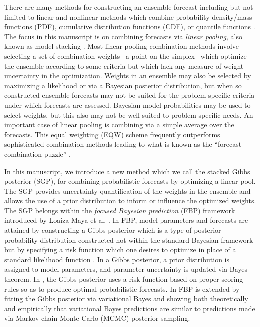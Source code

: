 There are many methods for constructing an ensemble forecast including but not 
limited to linear and nonlinear methods \cite[]{yao2018using,
geweke2011optimal,hall2007combining,bassetti2018bayesian,
gneiting2013combining,ranjan2010combining} which combine
probability density/mass functions (PDF), cumulative distribution functions 
(CDF), or quantile functions \cite[]{lichtendahl2013better}. The focus in this 
manuscript is on combining forecasts via \textit{linear pooling}, also known as 
model stacking \cite[]{yao2018using,geweke2011optimal,hall2007combining,
stone1961opinion}. Most linear pooling combination methods involve selecting 
a set of combination weights --a point on the simplex-- which optimize the 
ensemble according to some criteria but which lack any measure of weight
uncertainty in the optimization. Weights in an ensemble may also be selected 
by maximizing a likelihood or via a Bayesian posterior distribution, but when 
so constructed ensemble forecasts may not be suited for the problem specific 
criteria under which forecasts are assessed. Bayesian model probabilities may 
be used to select weights, but this also may not be well 
suited to problem specific needs. An important case of linear pooling is 
combining via a simple average over the forecasts. This equal weighting (EQW) 
scheme frequently outperforms sophisticated combination methods leading to 
what is known as the 
``forecast combination puzzle'' \cite[]{frazier2023solving,
claeskens2016forecast,smith2009simple}. 


In this manuscript, we introduce a new method which we call the stacked 
Gibbs posterior (SGP), for combining probabilistic forecasts by optimizing a 
linear pool. The SGP provides uncertainty quantification of the weights in 
the ensemble and allows the use of a prior distribution to inform or 
influence the optimized weights. 
The SGP belongs within the \textit{focused Bayesian prediction} (FBP) framework
introduced by Loaiza-Maya et al. \cite[]{loaiza2021focused}. 
In FBP, model parameters and forecasts are attained by constructing a Gibbs 
posterior which is a type of posterior probability distribution constructed 
not within the standard Bayesian framework but by specifying a risk function 
which one desires to optimize in place of a standard likelihood function 
\cite[]{martin2022direct,bissiri2016general}. In a Gibbs posterior, a prior
distribution is assigned to model parameters, and parameter uncertainty is
updated via Bayes theorem. In \cite[]{loaiza2021focused}, the Gibbs posterior
uses a risk function based on proper scoring rules so as to produce optimal
probabilistic 
forecasts. In \cite[]{frazier2025loss} FBP is extended by fitting
the Gibbs posterior via variational Bayes 
and showing both theoretically and 
empirically that variational Bayes predictions are similar to predictions 
made via Markov
chain Monte Carlo (MCMC) posterior sampling.

